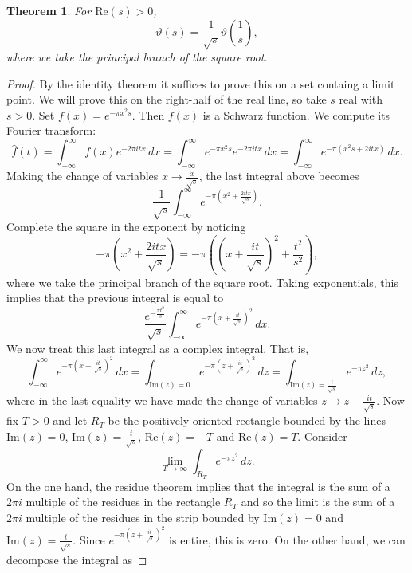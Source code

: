 \documentclass[12pt]{book}
\newtheorem{theorem}{Theorem}[section]
\theoremstyle{definition}\newframedtheorem{method}{Method}
\newcommand{\vt}{\vartheta}
\newcommand{\<}{\langle}
\renewcommand{\>}{\rangle}
\renewcommand{\Re}{\mathrm{Re}}
\renewcommand{\Im}{\mathrm{Im}}
\begin{document}
      \begin{theorem}
        For $\Re(s) > 0$,
        \[
          \vt(s) = \frac{1}{\sqrt{s}}\vt\left(\frac{1}{s}\right),
        \]
        where we take the principal branch of the square root.
      \end{theorem}
      \begin{proof}
        By the identity theorem it suffices to prove this on a set containg a limit point. We will prove this on the right-half of the real line, so take $s$ real with $s > 0$. Set $f(x) = e^{-\pi x^{2}s}$. Then $f(x)$ is a Schwarz function. We compute its Fourier transform:
        \[
          \hat{f}(t) = \int_{-\infty}^{\infty}f(x)e^{-2\pi itx}\,dx = \int_{-\infty}^{\infty}e^{-\pi x^{2}s}e^{-2\pi itx}\,dx = \int_{-\infty}^{\infty}e^{-\pi(x^{2}s+2itx)}\,dx.
        \]
        Making the change of variables $x \to \frac{x}{\sqrt{s}}$, the last integral above becomes
        \[
          \frac{1}{\sqrt{s}}\int_{-\infty}^{\infty}e^{-\pi\left(x^{2}+\frac{2itx}{\sqrt{s}}\right)}.
        \]
        Complete the square in the exponent by noticing
        \[
          -\pi\left(x^{2}+\frac{2itx}{\sqrt{s}}\right) = -\pi\left(\left(x+\frac{it}{\sqrt{s}}\right)^{2}+\frac{t^{2}}{s^{2}}\right),
        \]
        where we take the principal branch of the square root. Taking exponentials, this implies that the previous integral is equal to
        \[
          \frac{e^{-\frac{\pi t^{2}}{s}}}{\sqrt{s}}\int_{-\infty}^{\infty}e^{-\pi\left(x+\frac{it}{\sqrt{s}}\right)^{2}}\,dx.
        \]
        We now treat this last integral as a complex integral. That is,
        \[
          \int_{-\infty}^{\infty}e^{-\pi\left(x+\frac{it}{\sqrt{s}}\right)^{2}}\,dx = \int_{\Im(z) = 0}e^{-\pi\left(z+\frac{it}{\sqrt{s}}\right)^{2}}\,dz = \int_{\Im(z) = \frac{t}{\sqrt{s}}}e^{-\pi z^{2}}\,dz,
        \]
        where in the last equality we have made the change of variables $z \to z-\frac{it}{\sqrt{s}}$. Now fix $T > 0$ and let $R_{T}$ be the positively oriented rectangle bounded by the lines $\Im(z) = 0$, $\Im(z) = \frac{t}{\sqrt{s}}$, $\Re(z) = -T$ and $\Re(z) = T$. Consider
        \[
          \lim_{T \to \infty}\int_{R_{T}}e^{-\pi z^{2}}\,dz.
        \]
        On the one hand, the residue theorem implies that the integral is the sum of a $2\pi i$ multiple of the residues in the rectangle $R_{T}$ and so the limit is the sum of a $2\pi i$ multiple of the residues in the strip bounded by $\Im(z) = 0$ and $\Im(z) = \frac{t}{\sqrt{s}}$. Since $e^{-\pi\left(z+\frac{it}{\sqrt{s}}\right)^{2}}$ is entire, this is zero. On the other hand, we can decompose the integral as

\end{proof}
\end{document}
